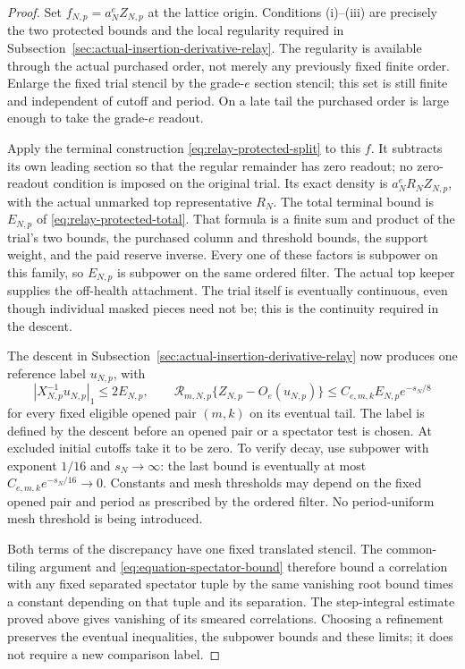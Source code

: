 \begin{proof}
Set $f_{N,p}=a_N^e Z_{N,p}$ at the lattice origin. Conditions (i)--(iii)
are precisely the two protected bounds and the local regularity
required in Subsection~\ref{sec:actual-insertion-derivative-relay}.
The regularity is available through the actual purchased order,
not merely any previously fixed finite order. Enlarge the fixed trial
stencil by the grade-$e$ section stencil; this set is still finite and
independent of cutoff and period. On a late tail the purchased order
is large enough to take the grade-$e$ readout.

Apply the terminal construction
\eqref{eq:relay-protected-split} to this $f$. It subtracts its own
leading section so that the regular remainder has zero readout;
no zero-readout condition is imposed on the original trial. Its exact
density is $a_N^e R_N Z_{N,p}$, with the actual unmarked top
representative $R_N$. The total terminal bound is
$E_{N,p}$ of \eqref{eq:relay-protected-total}. That formula is a
finite sum and product of the trial's two bounds, the purchased
column and threshold bounds, the support weight, and the paid
reserve inverse. Every one of these factors is subpower on this
family, so $E_{N,p}$ is subpower on the same ordered filter.
The actual top keeper supplies the off-health attachment. The trial
itself is eventually continuous, even though individual masked
pieces need not be; this is the continuity required in the descent.

The descent in Subsection~\ref{sec:actual-insertion-derivative-relay}
now produces one reference label $u_{N,p}$, with
\[
 |X_{N,p}^{-1}u_{N,p}|_1\le2E_{N,p},\qquad
 \mathcal R_{m,N,p}\{Z_{N,p}-O_e(u_{N,p})\}
       \le C_{e,m,k}E_{N,p}e^{-s_N/8}
\]
for every fixed eligible opened pair $(m,k)$ on its eventual tail.
The label is defined by the descent before an opened pair or a
spectator test is chosen. At excluded initial cutoffs take it to be
zero. To verify decay, use subpower with exponent $1/16$ and
$s_N\to\infty$: the last bound is eventually at most
$C_{e,m,k}e^{-s_N/16}\to0$. Constants and mesh thresholds may depend
on the fixed opened pair and period as prescribed by the ordered
filter. No period-uniform mesh threshold is being introduced.

Both terms of the discrepancy have one fixed translated stencil.
The common-tiling argument and
\eqref{eq:equation-spectator-bound} therefore bound a correlation
with any fixed separated spectator tuple by the same vanishing
root bound times a constant depending on that tuple and its
separation. The step-integral estimate proved above gives vanishing
of its smeared correlations. Choosing a refinement preserves the
eventual inequalities, the subpower bounds and these limits; it
does not require a new comparison label.
\end{proof}

